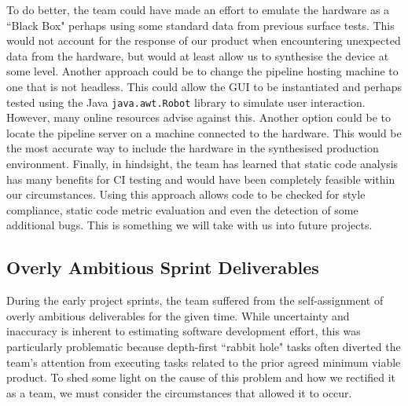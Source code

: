 \documentclass{l3proj}
\begin{document}
To do better, the team could have made an effort to emulate the hardware as a ``Black Box" perhaps using some standard data from previous surface tests. This would not account for the response of our product when encountering unexpected data from the hardware, but would at least allow us to synthesise the device at some level. Another approach could be to change the pipeline hosting machine to one that is not headless. This could allow the GUI to be instantiated and perhaps tested using the Java \verb|java.awt.Robot| library to simulate user interaction. However, many online resources advise against this\cite{ruiz}.
Another option could be to locate the pipeline server on a machine connected to the hardware. This would be the most accurate way to include the hardware in the synthesised production environment. Finally, in hindsight, the team has learned that static code analysis has many benefits for CI testing and would have been completely feasible within our circumstances. Using this approach allows code to be checked for style compliance, static code metric evaluation and even the detection of some additional bugs\cite{balachandran}. This is something we will take with us into future projects.

\subsection{Overly Ambitious Sprint Deliverables}
\label{subsection:over}
During the early project sprints, the team suffered from the self-assignment of overly ambitious deliverables for the given time. While uncertainty and inaccuracy is inherent to estimating software development effort\cite{ezghari}, this was particularly problematic because depth-first ``rabbit hole" tasks often diverted the team's attention from executing tasks related to the prior agreed minimum viable product. To shed some light on the cause of this problem and how we rectified it as a team, we must consider the circumstances that allowed it to occur.
\end{document}
